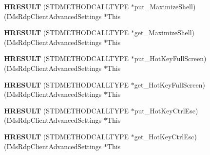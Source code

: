 \begin{DoxyCompactItemize}
\mbox{\label{struct_i_ms_rdp_client_advanced_settings_vtbl_ac27bb7b895868e7f29d82160e232fd89}} 
{\bfseries H\+R\+E\+S\+U\+LT} (S\+T\+D\+M\+E\+T\+H\+O\+D\+C\+A\+L\+L\+T\+Y\+PE $\ast$put\+\_\+\+Maximize\+Shell)(I\+Ms\+Rdp\+Client\+Advanced\+Settings $\ast$This
\item 
\mbox{\label{struct_i_ms_rdp_client_advanced_settings_vtbl_a94afc5c1555823c2ce95e14a7abed08f}} 
{\bfseries H\+R\+E\+S\+U\+LT} (S\+T\+D\+M\+E\+T\+H\+O\+D\+C\+A\+L\+L\+T\+Y\+PE $\ast$get\+\_\+\+Maximize\+Shell)(I\+Ms\+Rdp\+Client\+Advanced\+Settings $\ast$This
\item 
\mbox{\label{struct_i_ms_rdp_client_advanced_settings_vtbl_a7247725d7d8839fb1e9413a161abae1a}} 
{\bfseries H\+R\+E\+S\+U\+LT} (S\+T\+D\+M\+E\+T\+H\+O\+D\+C\+A\+L\+L\+T\+Y\+PE $\ast$put\+\_\+\+Hot\+Key\+Full\+Screen)(I\+Ms\+Rdp\+Client\+Advanced\+Settings $\ast$This
\item 
\mbox{\label{struct_i_ms_rdp_client_advanced_settings_vtbl_a523df7e1f257fde3e19ff50ad08c386c}} 
{\bfseries H\+R\+E\+S\+U\+LT} (S\+T\+D\+M\+E\+T\+H\+O\+D\+C\+A\+L\+L\+T\+Y\+PE $\ast$get\+\_\+\+Hot\+Key\+Full\+Screen)(I\+Ms\+Rdp\+Client\+Advanced\+Settings $\ast$This
\item 
\mbox{\label{struct_i_ms_rdp_client_advanced_settings_vtbl_a02ab42ddd5a6b677d2575eb580953241}} 
{\bfseries H\+R\+E\+S\+U\+LT} (S\+T\+D\+M\+E\+T\+H\+O\+D\+C\+A\+L\+L\+T\+Y\+PE $\ast$put\+\_\+\+Hot\+Key\+Ctrl\+Esc)(I\+Ms\+Rdp\+Client\+Advanced\+Settings $\ast$This
\item 
\mbox{\label{struct_i_ms_rdp_client_advanced_settings_vtbl_a1412fca8cd5d7ac897e896006683a5ea}} 
{\bfseries H\+R\+E\+S\+U\+LT} (S\+T\+D\+M\+E\+T\+H\+O\+D\+C\+A\+L\+L\+T\+Y\+PE $\ast$get\+\_\+\+Hot\+Key\+Ctrl\+Esc)(I\+Ms\+Rdp\+Client\+Advanced\+Settings $\ast$This
\item 
\mbox{\label{struct_i_ms_rdp_client_advanced_settings_vtbl_a5c817702ddb5dfebacd35770310aa3d9}} 

\end{DoxyCompactItemize}
